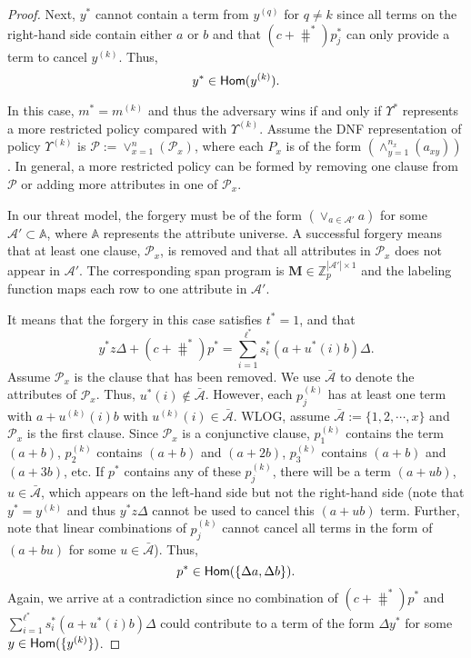 \begin{proof}
Next, $y^\ast$ cannot contain a term from $y^{(q)}$ for $q\neq k$ since all terms on the right-hand side contain either $a$ or $b$ and that $(c+\hash^\ast)p_j^\ast$ can only provide a term to cancel $y^{(k)}$. Thus,
$$
y^\ast \in \textsf{Hom}(y^{(k)}).
$$

In this case, $m^\ast = m^{(k)}$ and thus the adversary wins if and only if $\Upsilon^\ast$ represents a more restricted policy compared with $\Upsilon^{(k)}$. Assume the DNF representation of policy $\Upsilon^{(k)}$ is $\mathcal{P}:=\vee_{x=1}^{n}(\mathcal{P}_x)$, where each $P_x$ is of the form $(\wedge_{y=1}^{n_x} (a_{xy}))$. In general, a more restricted policy can be formed by removing one clause from $\mathcal{P}$ or adding more attributes in one of $\mathcal{P}_x$.

In our threat model, the forgery must be of the form $(\lor_{a \in \mathcal{A}'} a)$ for some $\mathcal{A'} \subset \mathbb{A}$, where $\mathbb{A}$ represents the attribute universe. A successful forgery means that at least one clause, $\mathcal{P}_x$, is removed and that all attributes in $\mathcal{P}_x$ does not appear in $\mathcal{A}'$. The corresponding span program is $\mathbf{M} \in \mathbb{Z}_p^{|\mathcal{A}'| \times 1}$ and the labeling function maps each row to one attribute in $\mathcal{A}'$.

It means that the forgery in this case satisfies $t^\ast =1$, and that
$$
y^\ast z  \Delta + (c + \hash^\ast)p^\ast = \sum_{i=1}^{\ell^\ast} s^\ast_i (a+u^\ast(i)b)\Delta.
$$
Assume $\mathcal{P}_x$ is the clause that has been removed. We use $\bar{\mathcal{A}}$ to denote the attributes of $\mathcal{P}_x$. Thus, $u^\ast(i) \notin \bar{\mathcal{A}}$. However, each $p_{j}^{(k)}$ has at least one term with $a + u^{(k)}(i)b$ with $u^{(k)}(i) \in \bar{\mathcal{A}}$. WLOG, assume $\bar{\mathcal{A}}:=\{1,2, \cdots, x\}$ and $\mathcal{P}_x$ is the first clause. Since $\mathcal{P}_x$ is a conjunctive clause, $p^{(k)}_1$ contains the term $(a+b)$, $p^{(k)}_2$ contains $(a+b)$ and $(a+2b)$, $p^{(k)}_3$ contains $(a+b)$ and $(a+3b)$, etc. If $p^\ast$ contains any of these $p^{(k)}_{j}$, there will be a term $(a+ub)$, $u\in\bar{\mathcal{A}}$, which appears on the left-hand side but not the right-hand side (note that $y^{\ast} = y^{(k)}$ and thus $y^\ast z \Delta$ cannot be used to cancel this $(a+ub)$ term. Further, note that linear combinations of $p^{(k)}_j$ cannot cancel all terms in the form of $(a+bu)$ for some $u \in \bar{\mathcal{A}}$). Thus,
$$
p^\ast \in \textsf{Hom}( \{\Delta a, \Delta b\} ).
$$
Again, we arrive at a contradiction since no combination of $(c+\hash^\ast)p^\ast$ and $\sum_{i=1}^{\ell^\ast} s^\ast_i (a+u^\ast(i)b)\Delta$ could contribute to a term of the form $\Delta y^\ast$ for some $y\in \textsf{Hom}(\{y^{(k)}\})$.
\end{proof}

